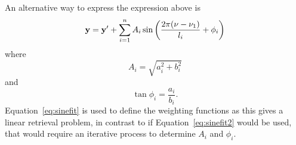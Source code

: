 An alternative way to express the expression above is
\begin{equation}
  \label{eq:sinefit2}
  \mathbf{y} = \mathbf{y}' + \sum_{i=1}^n A_i
             \sin\left(\frac{2\pi(\nu-\nu_{1})}{l_i} + \phi_i\right)
\end{equation}
where
\begin{equation}
  A_i = \sqrt{a_i^2+b_i^2}
\end{equation}
and
\begin{equation}
  \tan{\phi_i} = \frac{a_i}{b_i}.
\end{equation}
Equation~\ref{eq:sinefit} is used to define the weighting functions as this
gives a linear retrieval problem, in contrast to if Equation~\ref{eq:sinefit2}
would be used, that would require an iterative process to determine $A_i$
and $\phi_i$.



